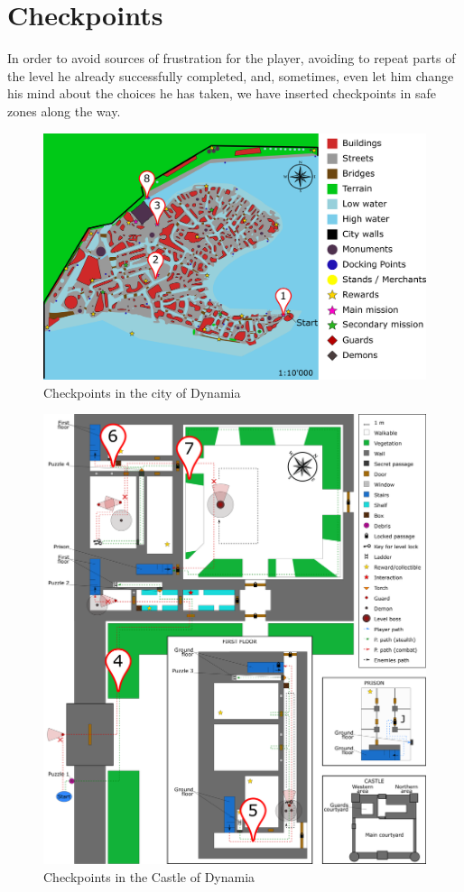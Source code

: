 \section{Checkpoints}

In order to avoid sources of frustration for the player, avoiding to repeat parts of the level he already successfully completed, and, sometimes, even let him change his mind about the choices he has taken, we have inserted checkpoints in safe zones along the way.
\begin{figure}[H]
  \centering
  \includegraphics[scale=0.47]{Images/Maps/dynamiaCheckpoints}
  \caption{Checkpoints in the city of Dynamia}
\end{figure}
\begin{figure}[H]
  \centering
  \includegraphics[scale=0.2]{Images/Maps/castleOfDynamiaCheckpoints}
  \caption{Checkpoints in the Castle of Dynamia}
\end{figure}

